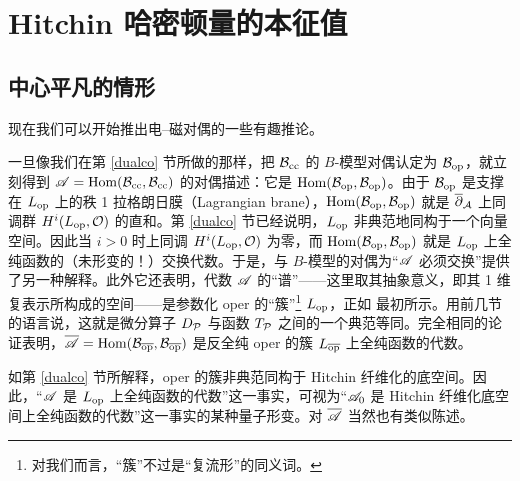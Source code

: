 
  \section{Hitchin 哈密顿量的本征值}\label{hitchval} 

\subsection{中心平凡的情形}\label{centertriv}

现在我们可以开始推出电–磁对偶的一些有趣推论。

一旦像我们在第 \ref{dualco} 节所做的那样，把 $\B_\cc$ 的 $B$-模型对偶认定为 $\B_\op$，就立刻得到 $\A=\Hom(\B_\cc,\B_\cc)$ 的对偶描述：它是 $\Hom(\B_\op,\B_\op)$。由于 $\B_\op$ 是支撑在 $L_\op$ 上的秩 1 拉格朗日膜（Lagrangian brane），$\Hom(\B_\op,\B_\op)$ 就是 $\bar\partial_\cA$ 上同调群 $H^i(L_\op, \O)$ 的直和。第 \ref{dualco} 节已经说明，$L_\op$ 非典范地同构于一个向量空间。因此当 $i>0$ 时上同调 $H^i(L_\op,\O)$ 为零，而 $\Hom(\B_\op,\B_\op)$ 就是 $L_\op$ 上全纯函数的（未形变的！）交换代数。于是，与 $B$-模型的对偶为“$\A$ 必须交换”提供了另一种解释。此外它还表明，代数 $\A$ 的“谱”——这里取其抽象意义，即其 1 维复表示所构成的空间——是参数化 oper 的“簇”\footnote{对我们而言，“簇”不过是“复流形”的同义词。} $L_\op$，正如\cite{BD} 最初所示。用前几节的语言说，这就是微分算子 $\D_\P$ 与函数 $T_\P$ 之间的一个典范等同。完全相同的论证表明，$\b\A=\Hom(\B_\bop,\B_\bop)$ 是反全纯 oper 的簇 $L_\bop$ 上全纯函数的代数。

如第 \ref{dualco} 节所解释，oper 的簇非典范同构于 Hitchin 纤维化的底空间。因此，“$\A$ 是 $L_\op$ 上全纯函数的代数”这一事实，可视为“$\A_0$ 是 Hitchin 纤维化底空间上全纯函数的代数”这一事实的某种量子形变。对 $\b\A$ 当然也有类似陈述。

